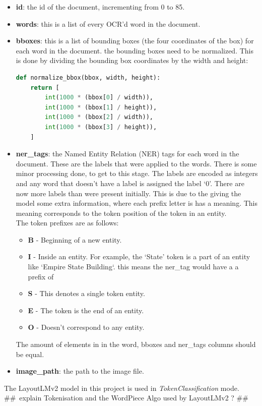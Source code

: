 \begin{itemize}
	\item \textbf{id}: the id of the document, incrementing from 0 to 85.
	\item \textbf{words}: this is a list of every OCR'd word in the document.
	\item \textbf{bboxes}: this is a list of bounding boxes (the four coordinates of the box) for each word in the document.
	      the bounding boxes need to be normalized. This is done by dividing the bounding box coordinates by the width and height:
	      \begin{lstlisting}[language=python, label={lst:bbox_normalization}, caption={Bounding Box Normalization}]
	def normalize_bbox(bbox, width, height):
    return [
        int(1000 * (bbox[0] / width)),
        int(1000 * (bbox[1] / height)),
        int(1000 * (bbox[2] / width)),
        int(1000 * (bbox[3] / height)),
    ]
	\end{lstlisting}
	\item \textbf{ner\_tags}: the Named Entity Relation (NER) tags for each word in the document. These are the labels
	      that were applied to the words. There is some minor processing done, to get to this stage. The labels are
	      encoded as integers and any word that doesn't have a label is assigned the label `0'.
	      \bigbreak
	      There are now more labels than were present initially. This is due to the giving the model some extra information,
	      where each prefix letter is has a meaning. This meaning corresponds to the token position of the token in an entity.\\
	      The token prefixes are as follows:
	      \begin{itemize}
		      \item \textbf{B} - Beginning of a new entity.
		      \item \textbf{I} - Inside an entity. For example, the `State' token is a part of an entity like `Empire State Building`.
		            this means the ner\_tag would have a a prefix of ~\autocite{TokenClassification}
		      \item \textbf{S} - This denotes a single token entity.
		      \item \textbf{E} - The token is the end of an entity.
		      \item \textbf{O} - Doesn't correspond to any entity.
	      \end{itemize}
	      The amount of elements in in the word, bboxes and ner\_tags columns should be equal.
		
	\item \textbf{image\_path}: the path to the image file.
\end{itemize}
\bigbreak
The LayoutLMv2 model in this project is used in \emph{TokenClassification} mode. \\
\#\#\ explain Tokenisation and the WordPiece Algo used by LayoutLMv2 ? \#\#\
